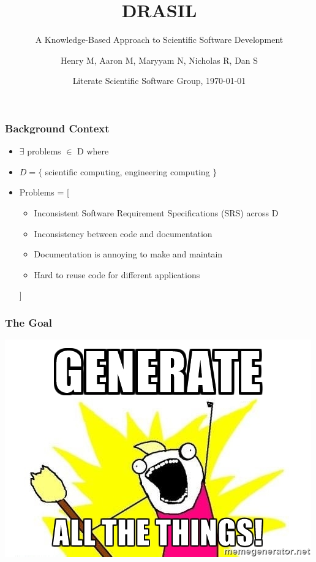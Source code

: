 \documentclass{beamer}
\title{DRASIL}
\subtitle{A Knowledge-Based Approach to Scientific Software Development}
\author{Henry M, Aaron M, Maryyam N, Nicholas R, Dan S}
\institute{McMaster University}
\date[LSS \today]{Literate Scientific Software Group, \today}
\begin{document}
\frame{\titlepage}

\begin{frame}
\frametitle{Background Context}
\begin{itemize}
 \item $\exists$ problems $\in$ D where
 \item $D = \{$ scientific computing, engineering computing $\}$
 \item Problems = [\\
  \begin{itemize}
   \item Inconsistent Software Requirement Specifications (SRS) across D
   \item Inconsistency between code and documentation
   \item Documentation is annoying to make and maintain
   \item Hard to reuse code for different applications
  \end{itemize}
 ]
\end{itemize}
\end{frame}

\begin{frame}
\frametitle{The Goal}
\includegraphics[scale=0.70]{../WG2_11/generate_all_the_things.jpg}
\end{frame}
\end{document}
